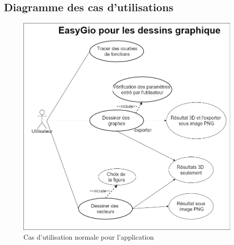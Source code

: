 \documentclass[a4paper]{report}
\begin{document}
\subsection{Diagramme des cas d'utilisations}
\begin{figure}[!h]
    \centering
    \includegraphics[width=14cm]{images/MY UML.PNG}
    \caption{Cas d'utilisation normale pour l'application}
    \label{fig:Cas d'utilisation normale pour l'application}
\end{figure}
\newpage
\end{document}
